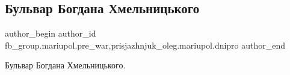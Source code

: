  
 
 
 
 

\subsection{Бульвар Богдана Хмельницького}
\label{sec:28_02_2023.fb.fb_group.mariupol.pre_war.1.bulvar_bogdana_khmel}
 
\ifcmt
 author_begin
   author_id fb_group.mariupol.pre_war,prisjazhnjuk_oleg.mariupol.dnipro
 author_end
\fi

Бульвар Богдана Хмельницького.

